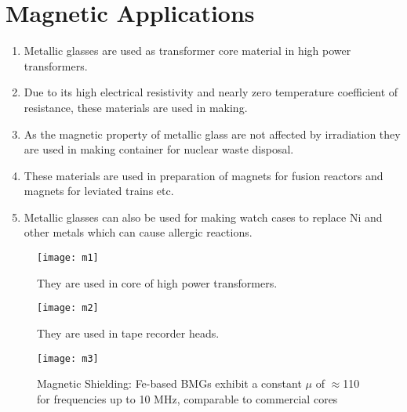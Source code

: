 \section{Magnetic Applications}
\begin{enumerate}
\item Metallic glasses are used as transformer core material in high power transformers.
\item Due to its high electrical resistivity and nearly zero temperature coefficient of resistance, these materials are used in making.
\item As the magnetic property of metallic glass are not affected by irradiation they are used in making container for nuclear waste disposal.
\item These materials are used in preparation of magnets for fusion reactors and magnets for leviated trains etc.
\item	Metallic glasses can also be used for making watch cases to replace Ni and other metals which can cause allergic reactions.
\end{enumerate}

\begin{figure}[h!]
\centering
\texttt{[image: m1]}
\caption{They are used in core  of high power transformers.
}
\end{figure}

\begin{figure}[h!]
\centering
\texttt{[image: m2]}
\caption{They are used in tape recorder heads.
}
\end{figure}

\begin{figure}[h!]
\centering
\texttt{[image: m3]}
\caption{Magnetic Shielding: Fe-based BMGs exhibit a constant $\mu$ of $\approx$110 for frequencies up to 10 MHz, comparable to commercial cores}
\end{figure}

